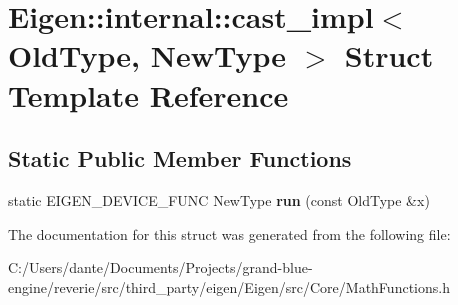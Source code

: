 \hypertarget{struct_eigen_1_1internal_1_1cast__impl}{}\section{Eigen\+::internal\+::cast\+\_\+impl$<$ Old\+Type, New\+Type $>$ Struct Template Reference}
\label{struct_eigen_1_1internal_1_1cast__impl}
\subsection*{Static Public Member Functions}
\begin{DoxyCompactItemize}
\item 
\mbox{\label{struct_eigen_1_1internal_1_1cast__impl_a1775802b765eaa5f7954dc37f961d6e6}} 
static E\+I\+G\+E\+N\+\_\+\+D\+E\+V\+I\+C\+E\+\_\+\+F\+U\+NC New\+Type {\bfseries run} (const Old\+Type \&x)
\end{DoxyCompactItemize}


The documentation for this struct was generated from the following file\+:\begin{DoxyCompactItemize}
\item 
C\+:/\+Users/dante/\+Documents/\+Projects/grand-\/blue-\/engine/reverie/src/third\+\_\+party/eigen/\+Eigen/src/\+Core/Math\+Functions.\+h\end{DoxyCompactItemize}
